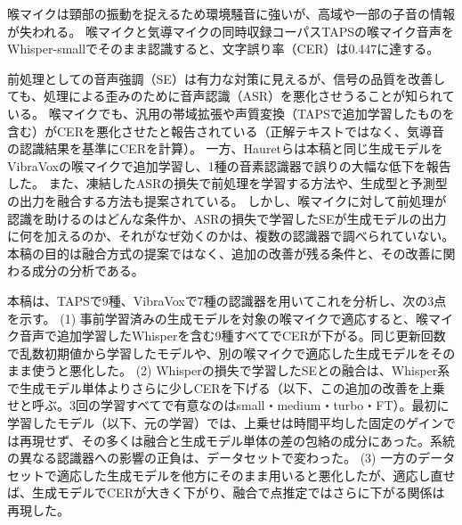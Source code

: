 \documentclass[xelatex,ja=standard,a4paper,twocolumn,10pt]{bxjsarticle}
\makeatletter
\renewcommand{\section}{\@startsection{section}{1}{\z@}{1.0ex plus .3ex}{.5ex}{\normalfont\large\sffamily\bfseries}}
\makeatother
\begin{document}

\section{はじめに}
喉マイクは頸部の振動を捉えるため環境騒音に強いが、高域や一部の子音の情報が失われる。
喉マイクと気導マイクの同時収録コーパスTAPS\cite{taps}の喉マイク音声をWhisper-small\cite{whisper}でそのまま認識すると、文字誤り率（CER）は0.447に達する。

前処理としての音声強調（SE）は有力な対策に見えるが、信号の品質を改善しても、処理による歪みのために音声認識（ASR）を悪化させうることが知られている\cite{ochiai2024}。
喉マイクでも、汎用の帯域拡張や声質変換（TAPSで追加学習したものを含む）がCERを悪化させたと報告されている（正解テキストではなく、気導音の認識結果を基準にCERを計算）\cite{yamanaka2026}。
一方、Hauretら\cite{hauret2025rt}は本稿と同じ生成モデルをVibraVoxの喉マイクで追加学習し、1種の音素認識器で誤りの大幅な低下を報告した。
また、凍結したASRの損失で前処理を学習する方法\cite{dissen2024}や、生成型と予測型の出力を融合する方法\cite{shi2024}も提案されている。
しかし、喉マイクに対して前処理が認識を助けるのはどんな条件か、ASRの損失で学習したSEが生成モデルの出力に何を加えるのか、それがなぜ効くのかは、複数の認識器で調べられていない。
本稿の目的は融合方式の提案ではなく、追加の改善が残る条件と、その改善に関わる成分の分析である。

本稿は、TAPSで9種、VibraVoxで7種の認識器を用いてこれを分析し、次の3点を示す。
(1) 事前学習済みの生成モデルを対象の喉マイクで適応すると、喉マイク音声で追加学習したWhisperを含む9種すべてでCERが下がる。同じ更新回数で乱数初期値から学習したモデルや、別の喉マイクで適応した生成モデルをそのまま使うと悪化した。
(2) Whisperの損失で学習したSEとの融合は、Whisper系で生成モデル単体よりさらに少しCERを下げる（以下、この追加の改善を上乗せと呼ぶ。3回の学習すべてで有意なのはsmall・medium・turbo・FT）。最初に学習したモデル（以下、元の学習）では、上乗せは時間平均した固定のゲインでは再現せず、その多くは融合と生成モデル単体の差の包絡の成分にあった。系統の異なる認識器への影響の正負は、データセットで変わった。
(3) 一方のデータセットで適応した生成モデルを他方にそのまま用いると悪化したが、適応し直せば、生成モデルでCERが大きく下がり、融合で点推定ではさらに下がる関係は再現した。
\end{document}
